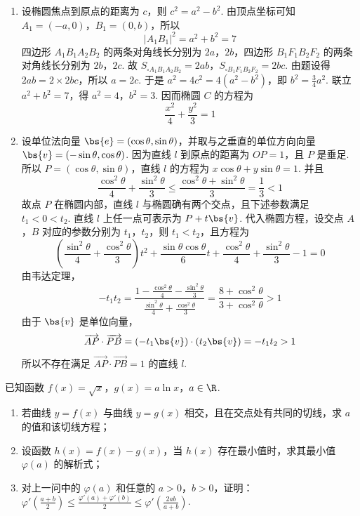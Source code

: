 \begin{solution}
\begin{enumerate}
\item 设椭圆焦点到原点的距离为 \(c\)，则 \(c^2=a^2-b^2\). 由顶点坐标可知 \(A_1=(-a,0)\)，\(B_1=(0,b)\)，所以
\[
|A_1B_1|^2=a^2+b^2=7
\]
四边形 \(A_1B_1A_2B_2\) 的两条对角线长分别为 \(2a\)，\(2b\)，四边形 \(B_1F_1B_2F_2\) 的两条对角线长分别为 \(2b\)，\(2c\). 故 \(S_{\square A_1B_1A_2B_2}=2ab\)，\(S_{\square B_1F_1B_2F_2}=2bc\).
由题设得 \(2ab=2\times2bc\)，所以 \(a=2c\). 于是 \(a^2=4c^2=4(a^2-b^2)\)，即 \(b^2=\frac34a^2\). 联立 \(a^2+b^2=7\)，得 \(a^2=4\)，\(b^2=3\). 因而椭圆 \(C\) 的方程为
\[
\frac{x^2}{4}+\frac{y^2}{3}=1
\]
\item 设单位法向量 \(\bs{e}=(\cos\theta,\sin\theta)\)，并取与之垂直的单位方向向量 \(\bs{v}=(-\sin\theta,\cos\theta)\). 因为直线 \(l\) 到原点的距离为 \(OP=1\)，且 \(P\) 是垂足.
所以 \(P=(\cos\theta,\sin\theta)\)，直线 \(l\) 的方程为 \(x\cos\theta+y\sin\theta=1\).
并且
\[
\frac{\cos^2\theta}{4}+\frac{\sin^2\theta}{3}
\leqslant\frac{\cos^2\theta+\sin^2\theta}{3}=\frac13<1
\]
故点 \(P\) 在椭圆内部，直线 \(l\) 与椭圆确有两个交点，且下述参数满足 \(t_1<0<t_2\).
直线 \(l\) 上任一点可表示为 \(P+t\bs{v}\). 代入椭圆方程，设交点 \(A\)，\(B\) 对应的参数分别为 \(t_1\)，\(t_2\)，则 \(t_1<t_2\)，且方程为
\[
\left(\frac{\sin^2\theta}{4}+\frac{\cos^2\theta}{3}\right)t^2
+\frac{\sin\theta\cos\theta}{6}t
+\frac{\cos^2\theta}{4}+\frac{\sin^2\theta}{3}-1=0
\]
由韦达定理，
\[
-t_1t_2=\frac{1-\frac{\cos^2\theta}{4}-\frac{\sin^2\theta}{3}}{\frac{\sin^2\theta}{4}+\frac{\cos^2\theta}{3}}=\frac{8+\cos^2\theta}{3+\cos^2\theta}>1
\]
由于 \(\bs{v}\) 是单位向量，
\[
\overrightarrow{AP}\cdot\overrightarrow{PB}=(-t_1\bs{v})\cdot(t_2\bs{v})=-t_1t_2>1
\]
所以不存在满足 \(\overrightarrow{AP}\cdot\overrightarrow{PB}=1\) 的直线 \(l\).
\end{enumerate}
\end{solution}

\begin{problem}
已知函数 \( f(x) = \sqrt{x} \)，\( g(x) = a \ln x \)，\( a \in \R \).

\begin{enumerate}
\item 若曲线 \( y = f(x) \) 与曲线 \( y = g(x) \) 相交，且在交点处有共同的切线，求 \( a \) 的值和该切线方程；
\item 设函数 \( h(x) = f(x) - g(x) \)，当 \( h(x) \) 存在最小值时，求其最小值 \( \varphi(a) \) 的解析式；
\item 对上一问中的 \(\varphi(a)\) 和任意的 \(a > 0\)，\(b > 0\)，证明：\(\varphi'\left(\frac{a + b}{2}\right) \leqslant \frac{\varphi'(a) + \varphi'(b)}{2} \leqslant \varphi'\left(\frac{2ab}{a + b}\right)\).
\end{enumerate}
\end{problem}

